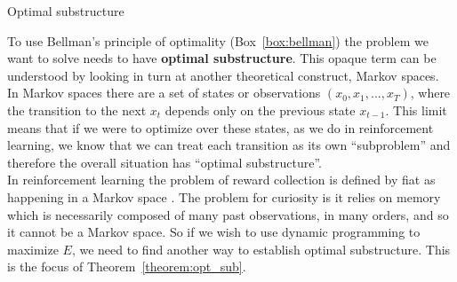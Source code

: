 \begin{featurebox}
	\caption{Optimal substructure}
	\label{box:substructure}
	To use Bellman's principle of optimality (Box~\ref{box:bellman}) the problem we want to solve needs to have \textbf{optimal substructure}. This opaque term can be understood by looking in turn at another theoretical construct, Markov spaces. 
	\\
	In Markov spaces there are a set of states or observations $(x_0, x_1, ..., x_{T})$, where the transition to the next $x_t$ depends only on the previous state $x_{t-1}$. This limit means that if we were to optimize over these states, as we do in reinforcement learning, we know that we can treat each transition as its own ``subproblem'' and therefore the overall situation has ``optimal substructure''.
	\\
	In reinforcement learning the problem of reward collection is defined by fiat as happening in a Markov space \citep{Sutton2018}. The problem for curiosity is it relies on memory which is necessarily composed of many past observations, in many orders, and so it cannot be a Markov space. So if we wish to use dynamic programming to maximize $E$, we need to find another way to establish optimal substructure. This is the focus of Theorem~\ref{theorem:opt_sub}.
	\medskip
\end{featurebox}

